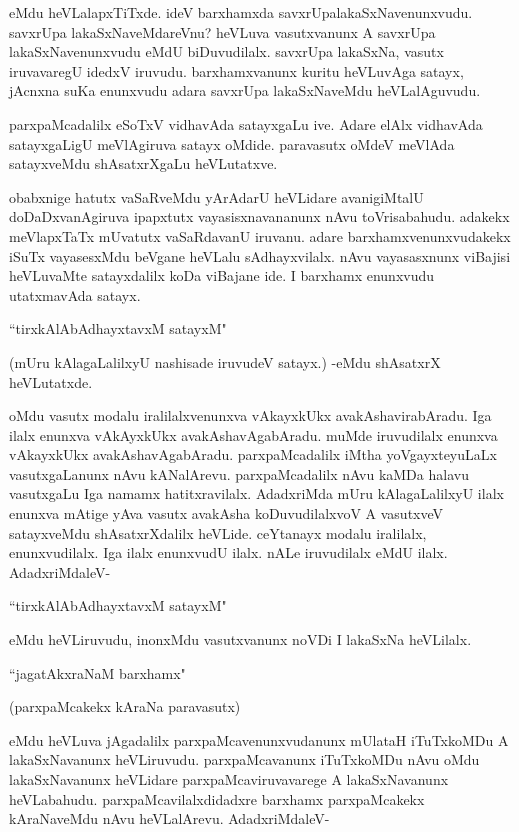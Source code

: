 \noindent eMdu heVLalapxTiTxde. ideV barxhamxda savxrUpalakaSxNavenunxvudu. savxrUpa lakaSxNaveMdareVnu? heVLuva vasutxvanunx A savxrUpa lakaSxNavenunxvudu eMdU biDuvudilalx. savxrUpa lakaSxNa, vasutx iruvavaregU idedxV iruvudu. barxhamxvanunx kuritu heVLuvAga satayx, jAcnxna suKa enunxvudu adara savxrUpa lakaSxNaveMdu heVLalAguvudu.

parxpaMcadalilx eSoTxV vidhavAda satayxgaLu ive. Adare elAlx vidhavAda satayxgaLigU meVlAgiruva satayx oMdide. paravasutx oMdeV meVlAda satayxveMdu shAsatxrXgaLu heVLutatxve.

obabxnige hatutx vaSaRveMdu yArAdarU heVLidare avanigiMtalU doDaDxvanAgiruva ipapxtutx vayasisxnavananunx nAvu toVrisabahudu. adakekx meVlapxTaTx mUvatutx vaSaRdavanU iruvanu. adare barxhamxvenunxvudakekx iSuTx vayasesxMdu beVgane heVLalu sAdhayxvilalx. nAvu vayasasxnunx viBajisi heVLuvaMte satayxdalilx koDa viBajane ide. I barxhamx enunxvudu utatxmavAda satayx. 

 \begin{shloka}
 ``tirxkAlAbAdhayxtavxM satayxM"
 \end{shloka}

(mUru kAlagaLalilxyU nashisade iruvudeV satayx.) -eMdu shAsatxrX heVLutatxde. 


oMdu vasutx modalu iralilalxvenunxva vAkayxkUkx avakAshavirabAradu. Iga ilalx enunxva vAkAyxkUkx avakAshavAgabAradu. muMde iruvudilalx enunxva vAkayxkUkx avakAshavAgabAradu. parxpaMcadalilx iMtha yoVgayxteyuLaLx vasutxgaLanunx nAvu kANalArevu. parxpaMcadalilx nAvu kaMDa halavu vasutxgaLu Iga namamx hatitxravilalx. AdadxriMda mUru kAlagaLalilxyU ilalx enunxva mAtige yAva vasutx avakAsha koDuvudilalxvoV A vasutxveV satayxveMdu shAsatxrXdalilx heVLide. ceYtanayx modalu iralilalx, enunxvudilalx. Iga ilalx enunxvudU ilalx. nALe iruvudilalx eMdU ilalx. AdadxriMdaleV-

\begin{shloka}
``tirxkAlAbAdhayxtavxM satayxM"
\end{shloka}

\noindent eMdu heVLiruvudu, inonxMdu vasutxvanunx noVDi I lakaSxNa heVLilalx.

\begin{shloka}
``jagatAkxraNaM barxhamx"
\end{shloka}

(parxpaMcakekx kAraNa paravasutx)

eMdu heVLuva jAgadalilx parxpaMcavenunxvudanunx mUlataH iTuTxkoMDu A lakaSxNavanunx heVLiruvudu. parxpaMcavanunx iTuTxkoMDu nAvu oMdu lakaSxNavanunx heVLidare parxpaMcaviruvavarege A lakaSxNavanunx heVLabahudu. parxpaMcavilalxdidadxre barxhamx parxpaMcakekx kAraNaveMdu nAvu heVLalArevu. AdadxriMdaleV-


